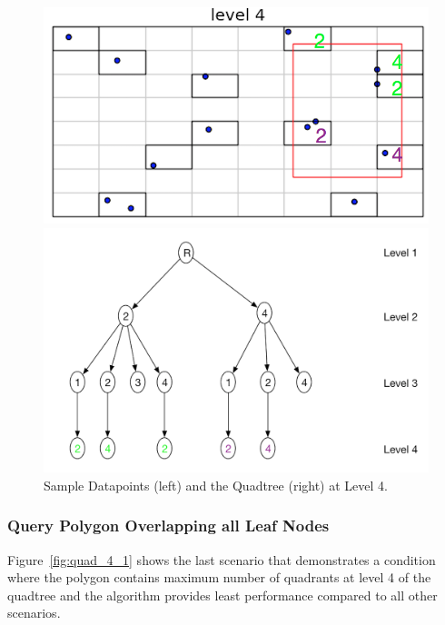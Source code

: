\begin{figure}[H]
  \centering
  \vspace{0.5in}
  \begin{minipage}[b]{0.35\textwidth}
    \includegraphics[width=\textwidth]{Images/2Quad_4}
  \end{minipage}
  \hfill
  \begin{minipage}[b]{0.6\textwidth}
    \includegraphics[width=\textwidth]{Images/2Quad_4_tree}
  \end{minipage}
  \vspace{0.5in}
  \caption{Sample Datapoints (left) and the Quadtree (right) at Level 4.}
  \label{fig:quad_2_4}
\end{figure}

\subsubsection{Query Polygon Overlapping all Leaf Nodes}

Figure~\ref{fig:quad_4_1} shows the last scenario that demonstrates a condition where the polygon contains maximum number of quadrants at level 4 of the quadtree and the algorithm provides least performance compared to all other scenarios.


